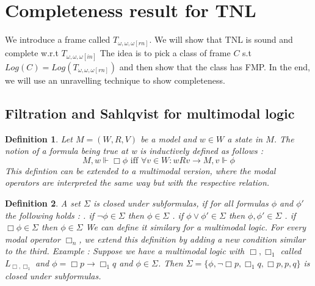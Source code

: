 \documentclass[12pt, a4paper]{scrartcl}
\newtheorem{definition}{Definition}[subsection]
\begin{document}
\section{Completeness result for TNL}

We introduce a frame called $T_{\omega, \omega, \omega[rn]}$. We will show that TNL is sound and complete w.r.t $T_{\omega, \omega, \omega[in]}$
The idea is to pick a class of frame $C$ s.t $Log(C) = Log(T_{\omega, \omega, \omega[rn]})$ and then show that the class has FMP.
In the end, we will use an unravelling technique to show completeness. 

\subsection{Filtration and Sahlqvist for multimodal logic}

\begin{definition}
    Let $M = (W,R,V)$ be a model and $w \in W$ a state in $M$. The notion of a formula being true at w is inductively defined as follows :
    $$M, w \Vdash \Box \phi \mbox{ iff } \forall v \in W : wRv \rightarrow M,v \Vdash \phi$$
    \newline
    This defintion can be extended to a multimodal version, where the modal operators are interpreted the same way but with the respective relation.   
\end{definition}

\begin{definition}
    A set $\Sigma$ is closed under subformulas, if for all formulas $\phi$ and $\phi'$ the following holds :
    \newline {}. if $\neg \phi \in \Sigma$ then $\phi \in \Sigma$
    . if $\phi \lor \phi' \in \Sigma$ then $\phi, \phi' \in \Sigma$
    . if $\Box \phi \in \Sigma$ then $\phi \in \Sigma$
    \newline
    \newline
    We can define it similary for a multimodal logic. For every modal operator $\Box_n$, we extend this definition by adding a new condition similar to the third.
    Example : Suppose we have a multimodal logic with $\Box, \Box_1$ called $L_{\Box, \Box_1}$ and $\phi = \Box p \rightarrow \Box_1 q$ and $\phi \in \Sigma$. Then $\Sigma = \{ \phi, \neg\Box p, \Box_1 q, \Box p, p, q\}$ is closed under
    subformulas.
\end{definition}
\end{document}
